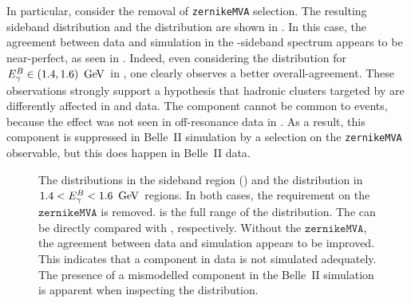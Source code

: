 In particular, consider the removal of \texttt{zernikeMVA} selection.
The resulting \EB sideband distribution and the \Mbc distribution are shown in .
In this case, the agreement between data and simulation in the \EB-sideband spectrum appears to be near-perfect, as seen in .
Indeed, even considering the \Mbc distribution for ${E^B_{\gamma}}\in(1.4,1.6)~\mathrm{\,Ge\kern -0.1em V}$ in , one clearly observes a better overall-agreement.
These observations strongly support a hypothesis that hadronic clusters targeted by \ZMVA are differently affected in \MC and data.
The component cannot be common to \epem\ra\qqbar events, because the effect was not seen in off-resonance data in .
As a result, this component is suppressed in Belle~II simulation by a selection on the \texttt{zernikeMVA} observable, but this does happen in Belle~II data.
\begin{figure}[htbp!]
    \caption{\label{fig:nozmva_test}   The \EB distributions in the \EB sideband region ()
    and the \Mbc distribution in $1.4<{E^B_{\gamma}}<1.6~\mathrm{\,Ge\kern -0.1em V}$ regions.
    In both cases, the requirement on the $\mathtt{zernikeMVA}$ is removed.
     is the full range of the \ZMVA distribution.
    The  can be directly compared with , respectively.
    Without the $\mathtt{zernikeMVA}$, the agreement between data and simulation appears to be improved.
    This indicates that a component in data is not simulated adequately.
    The presence of a mismodelled component in the Belle~II simulation is apparent when inspecting the \ZMVA distribution.
    }
\end{figure}

